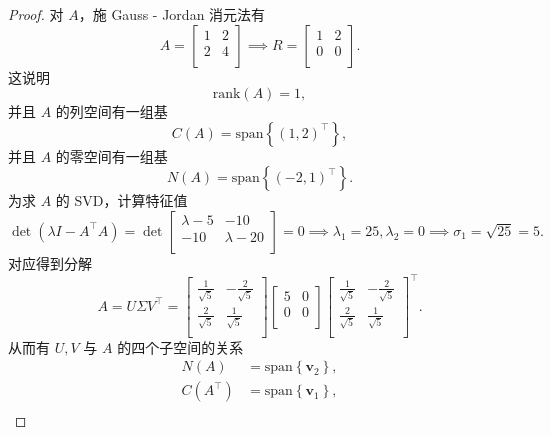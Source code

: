 \begin{proof}
    对 $A$，施 Gauss - Jordan 消元法有
    \[
        A = \begin{bmatrix}
            1 & 2 \\
            2 & 4 \\
        \end{bmatrix} \implies R = \begin{bmatrix}
            1 & 2 \\
            0 & 0 \\
        \end{bmatrix}.
    \]
    这说明
    \[
    \mathrm{rank} \left(A\right) = 1,
    \]
    并且 $A$ 的列空间有一组基
    \[
        C \left(A\right) = \mathrm{span} \left\{ \left(1, 2\right)^\top \right\},
    \]
    并且 $A$ 的零空间有一组基
    \[
        N \left(A\right) = \mathrm{span} \left\{ \left(-2, 1\right)^\top \right\}.
    \]
    为求 $A$ 的 SVD，计算特征值
    \[
        \det \left(\lambda I - A^\top A\right) = \det\begin{bmatrix}
            \lambda - 5 & -10 \\
            -10 & \lambda - 20 \\
        \end{bmatrix} = 0 \implies \lambda_1 = 25, \lambda_2 = 0 \implies \sigma_1 = \sqrt{25} = 5.
    \]
    对应得到分解
    \[
        A = U \Sigma V^\top = \begin{bmatrix}
            \frac{1}{\sqrt{5}} & -\frac{2}{\sqrt{5}} \\
            \frac{2}{\sqrt{5}} & \frac{1}{\sqrt{5}} \\
        \end{bmatrix} \begin{bmatrix}
            5 & 0 \\
            0 & 0 \\
        \end{bmatrix} \begin{bmatrix}
            \frac{1}{\sqrt{5}} & -\frac{2}{\sqrt{5}} \\
            \frac{2}{\sqrt{5}} & \frac{1}{\sqrt{5}} \\
        \end{bmatrix}^\top.
    \]
    从而有 $U, V$ 与 $A$ 的四个子空间的关系
    \[
    \begin{aligned}
        N \left(A\right) &= \mathrm{span} \left\{\boldsymbol{v}_2\right\}, \\
        C \left(A^\top\right) &= \mathrm{span} \left\{\boldsymbol{v}_1\right\}, \\

\end{aligned}\]
\end{proof}

